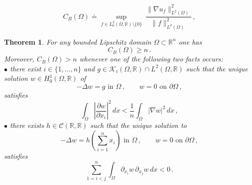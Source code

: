 \documentclass[10pt,a4paper]{amsart}
\newtheorem{theorem}{Theorem}
\newcommand{\R}{\mathbb{R}}
\begin{document}
\begin{equation}\label{bogo}
C_B(\Omega) \doteq \sup_{f\in L^2_0(\Omega,\R) \setminus \{0\}} \ \dfrac{\| \nabla u_{f} \|_{L^2(\Omega)}^2}{\| f \|_{L^2(\Omega)}^2} \, ,
\end{equation}

\begin{theorem}\label{lowerbound}
	For any bounded Lipschitz domain $\Omega\subset\R^n$ one has
	$$
	C_B(\Omega)\ge n \, .
	$$
Moreover, $C_B(\Omega)>n$ whenever one of the following two facts occurs:\\
$\bullet$ there exist $i \in \{1,...,n\}$ and $g\in\mathcal{K}_{i}(\Omega, \mathbb{R}) \cap L^{2}(\Omega, \mathbb{R})$ such that the unique solution $w \in H^{1}_{0}(\Omega, \mathbb{R})$ of
\begin{equation}\label{generalTorsion}
- \Delta w = g\mbox{ in }\Omega\, , \qquad w = 0\mbox{ on }\partial \Omega  \, ,
	\end{equation}
	satisfies
	\begin{equation}\label{condition}
	\int_\Omega \left| \dfrac{\partial w}{\partial x_{i}} \right|^2 \, dx<\frac{1}{n}\int_\Omega|\nabla w|^2\, dx\, ,
	\end{equation}
$\bullet$ there exists $h\in \mathcal{C}(\R, \mathbb{R})$ such that the unique solution to
\begin{equation}\label{hsum}
-\Delta w=h\left(\sum_{i=1}^nx_i\right)\mbox{ in }\Omega\, ,\qquad w=0\mbox{ on }\partial\Omega\, ,
\end{equation}
satisfies
\begin{equation}\label{negativepd}
\sum_{1=i<j}^{n}\int_\Omega\partial_{x_i}w\, \partial_{x_j}w\, dx<0\, .
\end{equation}
\end{theorem}
\end{document}

